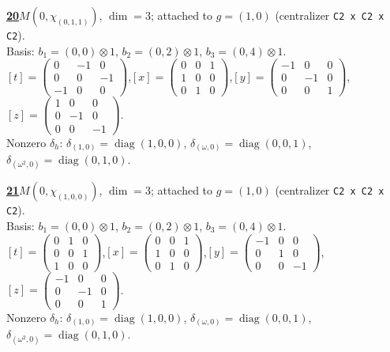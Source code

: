 \begin{samepage}\noindent\textbf{\underline{20}}\quad $M(0,\chi_{(0,1,1)})$, $\dim=3$; attached to $g=(1,0)$ (centralizer \texttt{C2 x C2 x C2}).\\
Basis: $b_{1}=(0,0)\otimes 1$, $b_{2}=(0,2)\otimes 1$, $b_{3}=(0,4)\otimes 1$.\\
$[t]=\left(\begin{smallmatrix} 0 & -1 & 0 \\ 0 & 0 & -1 \\ -1 & 0 & 0 \end{smallmatrix}\right)$,\quad $[x]=\left(\begin{smallmatrix} 0 & 0 & 1 \\ 1 & 0 & 0 \\ 0 & 1 & 0 \end{smallmatrix}\right)$,\quad $[y]=\left(\begin{smallmatrix} -1 & 0 & 0 \\ 0 & -1 & 0 \\ 0 & 0 & 1 \end{smallmatrix}\right)$,\quad $[z]=\left(\begin{smallmatrix} 1 & 0 & 0 \\ 0 & -1 & 0 \\ 0 & 0 & -1 \end{smallmatrix}\right)$.\\
Nonzero $\delta_h$: $\delta_{(1,0)}=\operatorname{diag}(1,0,0)$, $\delta_{(\omega,0)}=\operatorname{diag}(0,0,1)$, $\delta_{(\omega^2,0)}=\operatorname{diag}(0,1,0)$.\end{samepage}
\medskip

\begin{samepage}\noindent\textbf{\underline{21}}\quad $M(0,\chi_{(1,0,0)})$, $\dim=3$; attached to $g=(1,0)$ (centralizer \texttt{C2 x C2 x C2}).\\
Basis: $b_{1}=(0,0)\otimes 1$, $b_{2}=(0,2)\otimes 1$, $b_{3}=(0,4)\otimes 1$.\\
$[t]=\left(\begin{smallmatrix} 0 & 1 & 0 \\ 0 & 0 & 1 \\ 1 & 0 & 0 \end{smallmatrix}\right)$,\quad $[x]=\left(\begin{smallmatrix} 0 & 0 & 1 \\ 1 & 0 & 0 \\ 0 & 1 & 0 \end{smallmatrix}\right)$,\quad $[y]=\left(\begin{smallmatrix} -1 & 0 & 0 \\ 0 & 1 & 0 \\ 0 & 0 & -1 \end{smallmatrix}\right)$,\quad $[z]=\left(\begin{smallmatrix} -1 & 0 & 0 \\ 0 & -1 & 0 \\ 0 & 0 & 1 \end{smallmatrix}\right)$.\\
Nonzero $\delta_h$: $\delta_{(1,0)}=\operatorname{diag}(1,0,0)$, $\delta_{(\omega,0)}=\operatorname{diag}(0,0,1)$, $\delta_{(\omega^2,0)}=\operatorname{diag}(0,1,0)$.\end{samepage}
\medskip

